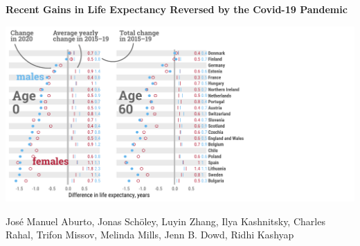\documentclass[xcolor={dvipsnames}]{beamer}
\begin{document}
\begin{frame}
\Large{
 \begin{center}
	\begin{center}
	 \textbf{Recent Gains in Life Expectancy Reversed by the Covid-19 Pandemic}\linebreak
	 
	\hspace*{2cm}   
\includegraphics[scale=.3]{fig-2-ann}\linebreak
	\end{center}
 
José Manuel Aburto, Jonas Schöley, Luyin Zhang, Ilya Kashnitsky, Charles Rahal, Trifon Missov, Melinda Mills, Jenn B. Dowd, Ridhi Kashyap


\end{center}
}
\end{frame}
\end{document}
